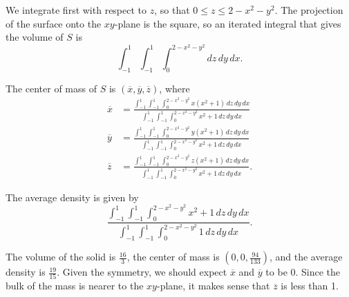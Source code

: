 \begin{smallhint}

\end{smallhint}
\begin{bighint}

\end{bighint}
\begin{activitySolution}
    \ba
    \item We integrate first with respect to $z$, so that $0 \leq z \leq 2-x^2-y^2$. The projection of the surface onto the $xy$-plane is the square, so an iterated integral that gives the volume of $S$ is 
\[\int_{-1}^1 \int_{-1}^1 \int_0^{2-x^2-y^2} dz \, dy \, dx.\]

    \item The center of mass of $S$ is $(\overline{x}, \overline{y}, \overline{z})$, where 
\begin{align*}
\overline{x} &= \frac{\int_{-1}^1 \int_{-1}^1 \int_0^{2-x^2-y^2} x(x^2+1) \, dz \, dy \, dx}{\int_{-1}^1 \int_{-1}^1 \int_0^{2-x^2-y^2} x^2+1 \, dz \, dy \, dx} \\
\overline{y} &= \frac{\int_{-1}^1 \int_{-1}^1 \int_0^{2-x^2-y^2} y(x^2+1) \, dz \, dy \, dx}{\int_{-1}^1 \int_{-1}^1 \int_0^{2-x^2-y^2} x^2+1 \, dz \, dy \, dx} \\
\overline{z} &= \frac{\int_{-1}^1 \int_{-1}^1 \int_0^{2-x^2-y^2} z(x^2+1) \, dz \, dy \, dx}{\int_{-1}^1 \int_{-1}^1 \int_0^{2-x^2-y^2} x^2+1 \, dz \, dy \, dx}.
\end{align*}

    \item The average density is given by 
\[\frac{\int_{-1}^1 \int_{-1}^1 \int_0^{2-x^2-y^2} x^2+1 \, dz \, dy \, dx}{\int_{-1}^1 \int_{-1}^1 \int_0^{2-x^2-y^2} 1 \, dz \, dy \, dx}.\]

	\item The volume of the solid is $\frac{16}{3}$, the center of mass is $\left(0,0,\frac{94}{133}\right)$, and the average density is $\frac{19}{15}$. Given the symmetry, we should expect $\overline{x}$ and $\overline{y}$ to be 0. Since the bulk of the mass is nearer to the $xy$-plane, it makes sense that $\overline{z}$ is less than 1.  
    \ea
\end{activitySolution}
\aftera
